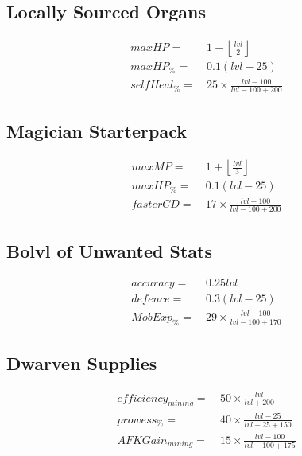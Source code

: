     \subsection{Locally Sourced Organs}

        \begin{align*}
            maxHP = &\  1 + \left\lfloor \frac{lvl}{2} \right\rfloor 
            \\
            maxHP_\%  = &\   0.1(lvl-25)
            \\
            selfHeal_\% = &\  25 \times \frac{lvl-100}{lvl-100+200}
        \end{align*}

    \subsection{Magician Starterpack}
        \begin{align*}
            maxMP = &\  1 + \left\lfloor \frac{lvl}{3} \right\rfloor 
            \\
            maxHP_\% = &\   0.1(lvl-25)
            \\
            fasterCD = &\  17 \times \frac{{lvl}-100}{{lvl}-100+200}
        \end{align*}

    \subsection{Bo{lvl} of Unwanted Stats}
        \begin{align*}
            accuracy= &\ 0.25{lvl}  
            \\
            defence= &\  0.3(lvl-25)
            \\
            MobExp_\% = &\  29 \times \frac{{lvl}-100}{{lvl}-100+170}
        \end{align*}
    \subsection{Dwarven Supplies}
        \begin{align*}
            efficiency_{mining} = &\   50 \times \frac{{lvl}}{{lvl}+200}
            \\
            prowess_\% = &\  40 \times \frac{{lvl}-25}{{lvl}-25+150}
            \\
            AFKGain_{mining} = &\  15 \times \frac{{lvl}-100}{{lvl}-100+175}
        \end{align*}

